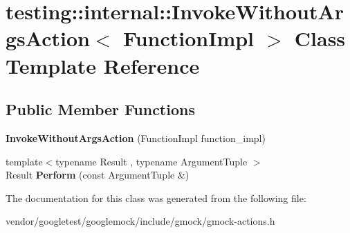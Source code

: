 \hypertarget{classtesting_1_1internal_1_1_invoke_without_args_action}{}\section{testing\+:\+:internal\+:\+:Invoke\+Without\+Args\+Action$<$ Function\+Impl $>$ Class Template Reference}
\label{classtesting_1_1internal_1_1_invoke_without_args_action}
\subsection*{Public Member Functions}
\begin{DoxyCompactItemize}
\item 
\mbox{\label{classtesting_1_1internal_1_1_invoke_without_args_action_a05d4006d8ab70e78172bf678b1d15f18}} 
{\bfseries Invoke\+Without\+Args\+Action} (Function\+Impl function\+\_\+impl)
\item 
\mbox{\label{classtesting_1_1internal_1_1_invoke_without_args_action_abdad2b7d19ff1cbd1d07a4bd585e3f4c}} 
{\footnotesize template$<$typename Result , typename Argument\+Tuple $>$ }\\Result {\bfseries Perform} (const Argument\+Tuple \&)
\end{DoxyCompactItemize}


The documentation for this class was generated from the following file\+:\begin{DoxyCompactItemize}
\item 
vendor/googletest/googlemock/include/gmock/gmock-\/actions.\+h\end{DoxyCompactItemize}
